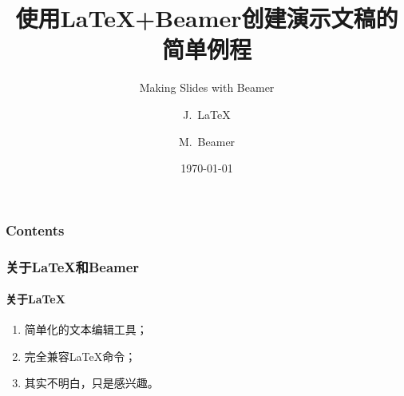 \documentclass{beamer}
\title{使用\LaTeX{}+Beamer创建演示文稿的简单例程}
\subtitle{Making Slides with Beamer}
\author
{J.~LaTeX\inst{1} \and M.~Beamer\inst{2}}
\institute
{
  \inst{1}
  机械工程学院~南京理工大学
  \and
  \inst{2}
  Department of Aerospace Engineering\\
  University of Bristol
}
\date{\today}
\begin{document}
\begin{frame}
  \titlepage
\end{frame}

\begin{frame}
    \frametitle{Contents}
    \tableofcontents[hidesubsections,sections={<1-4>}]
\end{frame}

\begin{frame}
  \frametitle{关于\LaTeX{}和Beamer}
  \framesubtitle{关于\LaTeX{}}
  \begin{enumerate}
    \item<1-> 简单化的文本编辑工具；
    \item<2-> 完全兼容\LaTeX{}命令；
    \item<3-> 其实不明白，只是感兴趣。
  \end{enumerate}
\end{frame}
\end{document}
